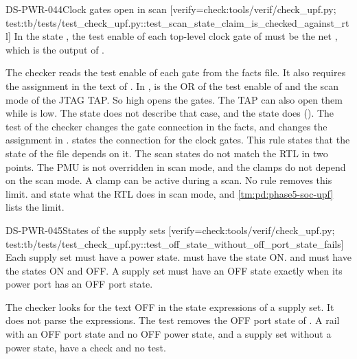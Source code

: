 \begin{requirement}{DS-PWR-044}{Clock gates open in scan}
[verify={check:tools/verif/check_upf.py; test:tb/tests/test_check_upf.py::test_scan_state_claim_is_checked_against_rtl}]
In the state , the test enable of each top-level clock gate of  must be the net , which is the output  of .
\end{requirement}
\begin{information}
The checker reads the test enable of each gate from the facts file. It also requires the assignment  in the text of . In ,  is the OR of the test enable of  and the scan mode of the JTAG TAP. So  high opens the gates. The TAP can also open them while  is low. The state  does not describe that case, and the state  does (). The test of the checker changes the gate connection in the facts, and  changes the assignment in .  states the connection for the clock gates. This rule states that the state  of the file depends on it. The scan states do not match the RTL in two points. The PMU is not overridden in scan mode, and the clamps do not depend on the scan mode. A clamp can be active during a scan. No rule removes this limit.  and  state what the RTL does in scan mode, and \cref{tm:pd:phase5-soc-upf} lists the limit.
\end{information}

\begin{requirement}{DS-PWR-045}{States of the supply sets}
[verify={check:tools/verif/check_upf.py; test:tb/tests/test_check_upf.py::test_off_state_without_off_port_state_fails}]
Each supply set must have a power state.  must have the state ON.  and  must have the states ON and OFF. A supply set must have an OFF state exactly when its power port has an OFF port state.
\end{requirement}
\begin{information}
The checker looks for the text OFF in the state expressions of a supply set. It does not parse the expressions. The test removes the OFF port state of . A rail with an OFF port state and no OFF power state, and a supply set without a power state, have a check and no test.
\end{information}

